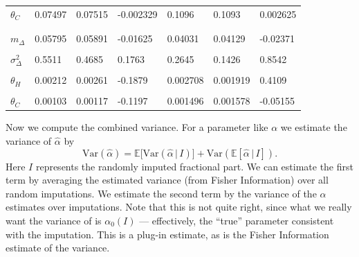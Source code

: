 \documentclass[
]{article}
\begin{document}
\begin{table}[!h]
\begin{tabular}[t]{lllllll}
\hspace{1em}$\theta_C$ & 0.07497 & 0.07515 & -0.002329 & 0.1096 & 0.1093 & 0.002625\\
\addlinespace[0.3em]
\multicolumn{7}{l}{\textbf{Parameter SE estimates}}\\
\cellcolor{gray!6}{\hspace{1em}$m_M$} & \cellcolor{gray!6}{0.1606} & \cellcolor{gray!6}{0.1697} & \cellcolor{gray!6}{-0.05365} & \cellcolor{gray!6}{0.08519} & \cellcolor{gray!6}{0.1054} & \cellcolor{gray!6}{-0.1915}\\
\hspace{1em}$m_\Delta$ & 0.05795 & 0.05891 & -0.01625 & 0.04031 & 0.04129 & -0.02371\\
\cellcolor{gray!6}{\hspace{1em}$\sigma^2_M$} & \cellcolor{gray!6}{4.386} & \cellcolor{gray!6}{3.829} & \cellcolor{gray!6}{0.1453} & \cellcolor{gray!6}{1.222} & \cellcolor{gray!6}{1.322} & \cellcolor{gray!6}{-0.0756}\\
\hspace{1em}$\sigma^2_\Delta$ & 0.5511 & 0.4685 & 0.1763 & 0.2645 & 0.1426 & 0.8542\\
\cellcolor{gray!6}{\hspace{1em}$\alpha_H$} & \cellcolor{gray!6}{0.05635} & \cellcolor{gray!6}{0.06761} & \cellcolor{gray!6}{-0.1666} & \cellcolor{gray!6}{0.06522} & \cellcolor{gray!6}{0.07412} & \cellcolor{gray!6}{-0.1201}\\
\hspace{1em}$\theta_H$ & 0.00212 & 0.00261 & -0.1879 & 0.002708 & 0.001919 & 0.4109\\
\cellcolor{gray!6}{\hspace{1em}$\alpha_C$} & \cellcolor{gray!6}{0.07702} & \cellcolor{gray!6}{0.08305} & \cellcolor{gray!6}{-0.07266} & \cellcolor{gray!6}{0.08383} & \cellcolor{gray!6}{0.08793} & \cellcolor{gray!6}{-0.04669}\\
\hspace{1em}$\theta_C$ & 0.00103 & 0.00117 & -0.1197 & 0.001496 & 0.001578 & -0.05155\\
\bottomrule
\end{tabular}
\end{table}

Now we compute the combined variance. For a parameter like \(\alpha\) we estimate the variance of \(\hat\alpha\) by
\newcommand{\E}{\mathbb{E}}
\renewcommand{\P}{\mathbb{P}}
\[
  \mathrm{Var}(\hat\alpha) = \mathbb{E}\bigl[ \mathrm{Var}\left(\hat\alpha\, |\, I\right)\bigr] + \mathrm{Var}\left(\mathbb{E} \left[ \hat\alpha\, |\, I \right]\right).
\]
Here \(I\) represents the randomly imputed fractional part.
We can estimate the first term by averaging the estimated variance (from Fisher Information) over all random imputations.
We estimate the second term by the variance of the \(\alpha\) estimates over imputations. Note that this is not quite right, since what we really
want the variance of is \(\alpha_0(I)\) --- effectively, the ``true'' parameter consistent with the imputation. This is a plug-in estimate,
as is the Fisher Information estimate of the variance.
\end{document}
